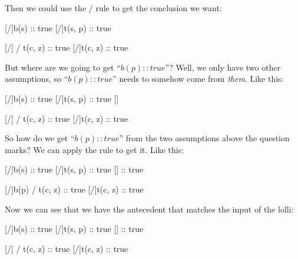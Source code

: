 \documentclass[../../../main.tex]{subfiles}
\begin{document}
\noindent
Then we could use the \lolliElim/ rule to get the conclusion we want:

\begin{prooftree*}
  \hypo{}
  [\startrule/]{b(s) :: true}
  \hypo{}
  [\startrule/]{t(s, p) :: true}

  \ellipsis{}{}
  
  \hypo{}
  [\startrule/]{ \lolli/ t(c, z) :: true}  
  [\lolliElim/]{t(c, z) :: true}

\end{prooftree*}

\noindent
But where are we going to get ``$b(p) :: true$''? Well, we only have two other assumptions, so ``$b(p) :: true$'' needs to somehow come from \emph{them}. Like this:

\begin{prooftree*}
  \hypo{}
  [\startrule/]{b(s) :: true}
  \hypo{}
  [\startrule/]{t(s, p) :: true}
  []{}
  \ellipsis{}{}
  \ellipsis{}{}
  
  \hypo{}
  [\startrule/]{ \lolli/ t(c, z) :: true}  
  [\lolliElim/]{t(c, z) :: true}
\end{prooftree*}

\noindent
So how do we get ``$b(p) :: true$'' from the two assumptions above the question marks? We can apply the  rule to get it. Like this:

\begin{prooftree*}
  \hypo{}
  [\startrule/]{b(s) :: true}
  \hypo{}
  [\startrule/]{t(s, p) :: true}
  []{ :: true}
  
  \hypo{}
  [\startrule/]{b(p) \lolli/ t(c, z) :: true}  
  [\lolliElim/]{t(c, z) :: true}
\end{prooftree*}

\noindent
Now we can see that we have the antecedent that matches the input of the lolli:

\begin{prooftree*}
  \hypo{}
  [\startrule/]{b(s) :: true}
  \hypo{}
  [\startrule/]{t(s, p) :: true}
  []{ :: true}
  
  \hypo{}
  [\startrule/]{ \lolli/ t(c, z) :: true}  
  [\lolliElim/]{t(c, z) :: true}
\end{prooftree*}
\end{document}
